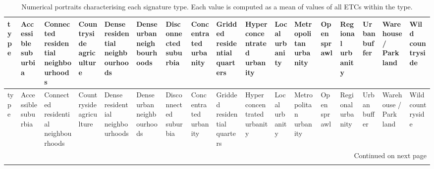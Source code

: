 \documentclass[fleqn,10pt]{wlscirep}
\begin{document}
\tiny
    \begin{longtable}{p{}p{}p{}p{}p{}p{}p{}p{}p{}p{}p{}p{}p{}p{}p{}p{}p{}}
        \caption{\label{tab:port}Numerical portraits characterising each signature type. Each value is computed as a mean of values of all ETCs within the type.}\\

        \toprule
        type &  Accessible suburbia &  Connected residential neighbourhoods &  Countryside agriculture &  Dense residential neighbourhoods &  Dense urban neighbourhoods &  Disconnected suburbia &  Concentrated urbanity &  Gridded residential quarters &  Hyper concentrated urbanity &  Local urbanity &  Metropolitan urbanity &  Open sprawl &  Regional urbanity &  Urban buffer &  Warehouse / Park land &  Wild countryside \\
        \midrule
        \endfirsthead

        \toprule
        type &  Accessible suburbia &  Connected residential neighbourhoods &  Countryside agriculture &  Dense residential neighbourhoods &  Dense urban neighbourhoods &  Disconnected suburbia &  Concentrated urbanity &  Gridded residential quarters &  Hyper concentrated urbanity &  Local urbanity &  Metropolitan urbanity &  Open sprawl &  Regional urbanity &  Urban buffer &  Warehouse / Park land &  Wild countryside \\
        \midrule
        \endhead
        \midrule
        \multicolumn{17}{r}{{Continued on next page}} \\
        \midrule
        \endfoot

        \bottomrule
        \endlastfoot


\end{longtable}
\end{document}
